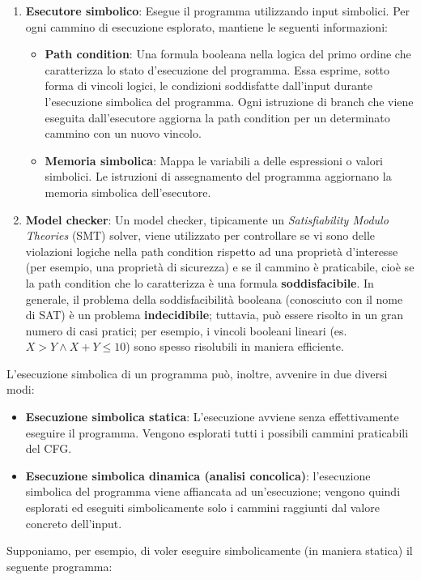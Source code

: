 \documentclass[../main.tex]{subfiles}
\begin{document}
\begin{enumerate}
    \item \textbf{Esecutore simbolico}: Esegue il programma utilizzando input simbolici. Per ogni cammino di esecuzione esplorato, mantiene le seguenti informazioni:
    \begin{itemize}
        \item \textbf{Path condition}: Una formula booleana nella logica del primo ordine che caratterizza lo stato d'esecuzione del programma. Essa esprime, sotto forma di vincoli logici, le condizioni soddisfatte dall'input durante l'esecuzione simbolica del programma.
        Ogni istruzione di branch che viene eseguita dall'esecutore aggiorna la path condition per un determinato cammino con un nuovo vincolo. 
        \item \textbf{Memoria simbolica}: Mappa le variabili a delle espressioni o valori simbolici. Le istruzioni di assegnamento del programma aggiornano la memoria simbolica dell'esecutore.
    \end{itemize}
    \item \textbf{Model checker}: Un model checker, tipicamente un \textit{Satisfiability Modulo Theories} (SMT) solver, viene utilizzato per controllare se vi sono delle violazioni logiche nella path condition rispetto ad una proprietà d'interesse (per esempio, una proprietà di sicurezza) e se il cammino è praticabile, cioè se la path condition che
    lo caratterizza è una formula \textbf{soddisfacibile}. In generale, il problema della soddisfacibilità booleana (conosciuto con il nome di SAT) è un problema \textbf{indecidibile}; tuttavia, può essere risolto in un gran numero di casi pratici; per esempio, 
    i vincoli booleani lineari (es. $X > Y \land X + Y \leq 10$) sono spesso risolubili in maniera efficiente.
\end{enumerate}
L'esecuzione simbolica di un programma può, inoltre, avvenire in due diversi modi:
\begin{itemize}
    \item \textbf{Esecuzione simbolica statica}: L'esecuzione avviene senza effettivamente eseguire il programma. Vengono esplorati tutti i possibili cammini praticabili del CFG.
    \item \textbf{Esecuzione simbolica dinamica (analisi concolica)}: l'esecuzione simbolica del programma viene affiancata ad un'esecuzione; vengono quindi esplorati ed eseguiti simbolicamente solo i cammini raggiunti dal valore concreto dell'input.
\end{itemize}
Supponiamo, per esempio, di voler eseguire simbolicamente (in maniera statica) il seguente programma:
\end{document}
